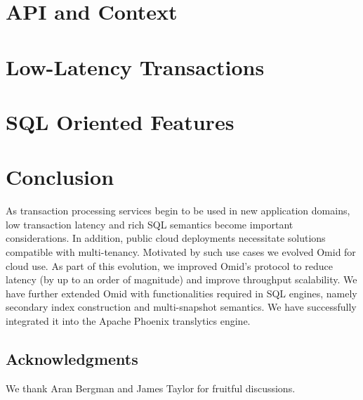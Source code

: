 \documentclass[twocolumn,10pt]{article}
\begin{document}
\section{API and Context} \label{sec:api}


\section{Low-Latency Transactions} \label{sec:ll}



%

%

\vspace{-0.3cm}
\section{SQL Oriented Features} \label{sec:sql}


\vspace{-0.4cm}
\section{Conclusion} \label{sec:conclusions}

As transaction processing services begin to be used in 
new application domains, low transaction latency and rich SQL semantics
become important considerations. In addition, public cloud deployments 
necessitate solutions compatible with multi-tenancy.
Motivated by such use cases we evolved Omid for cloud use.
As part of this evolution, we
improved Omid's protocol to reduce latency (by up to an order of magnitude) and improve throughput scalability.
%
We have further extended Omid with functionalities required in SQL engines, namely 
secondary index construction and multi-snapshot semantics. 
We have successfully integrated it into the Apache Phoenix translytics engine. 

\subsection*{Acknowledgments}
We thank Aran Bergman and James Taylor for fruitful discussions. 




\end{document}
